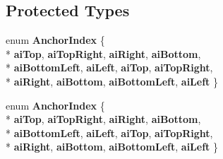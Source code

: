 \subsection*{Protected Types}
\begin{DoxyCompactItemize}
\item 
enum {\bfseries Anchor\+Index} \{ \\*
{\bfseries ai\+Top}, 
{\bfseries ai\+Top\+Right}, 
{\bfseries ai\+Right}, 
{\bfseries ai\+Bottom}, 
\\*
{\bfseries ai\+Bottom\+Left}, 
{\bfseries ai\+Left}, 
{\bfseries ai\+Top}, 
{\bfseries ai\+Top\+Right}, 
\\*
{\bfseries ai\+Right}, 
{\bfseries ai\+Bottom}, 
{\bfseries ai\+Bottom\+Left}, 
{\bfseries ai\+Left}
 \}\hypertarget{class_q_c_p_item_pixmap_a0ea7f65edb7395e02de521915f221174}{}\label{class_q_c_p_item_pixmap_a0ea7f65edb7395e02de521915f221174}

\item 
enum {\bfseries Anchor\+Index} \{ \\*
{\bfseries ai\+Top}, 
{\bfseries ai\+Top\+Right}, 
{\bfseries ai\+Right}, 
{\bfseries ai\+Bottom}, 
\\*
{\bfseries ai\+Bottom\+Left}, 
{\bfseries ai\+Left}, 
{\bfseries ai\+Top}, 
{\bfseries ai\+Top\+Right}, 
\\*
{\bfseries ai\+Right}, 
{\bfseries ai\+Bottom}, 
{\bfseries ai\+Bottom\+Left}, 
{\bfseries ai\+Left}
 \}\hypertarget{class_q_c_p_item_pixmap_a0ea7f65edb7395e02de521915f221174}{}\label{class_q_c_p_item_pixmap_a0ea7f65edb7395e02de521915f221174}

\end{DoxyCompactItemize}
